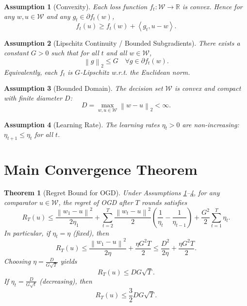 \documentclass{article}
\newtheorem{assumption}{Assumption}
\newtheorem{theorem}{Theorem}
\newcommand{\R}{\mathbb{R}}
\newcommand{\norm}[1]{\left\| #1 \right\|}
\newcommand{\inner}[2]{\left\langle #1, #2 \right\rangle}
\begin{document}
\begin{assumption}[Convexity] \label{asm:convex}
Each loss function $f_t : \mathcal{W} \to \R$ is convex. Hence for any $w, u \in \mathcal{W}$ and any $g_t \in \partial f_t(w)$,
\begin{equation}
    f_t(u) \ge f_t(w) + \inner{g_t}{u - w}.
\end{equation}
\end{assumption}

\begin{assumption}[Lipschitz Continuity / Bounded Subgradients] \label{asm:lipschitz}
There exists a constant $G > 0$ such that for all $t$ and all $w \in \mathcal{W}$,
\begin{equation}
    \norm{g}_2 \le G \quad \forall g \in \partial f_t(w).
\end{equation}
Equivalently, each $f_t$ is $G$-Lipschitz w.r.t. the Euclidean norm.
\end{assumption}

\begin{assumption}[Bounded Domain] \label{asm:bounded}
The decision set $\mathcal{W}$ is convex and compact with finite diameter $D$:
\begin{equation}
    D = \max_{w, u \in \mathcal{W}} \norm{w - u}_2 < \infty.
\end{equation}
\end{assumption}

\begin{assumption}[Learning Rate] \label{asm:lr}
The learning rates $\eta_t > 0$ are non-increasing: $\eta_{t+1} \le \eta_t$ for all $t$.
\end{assumption}

\section*{Main Convergence Theorem}
\begin{theorem}[Regret Bound for OGD] \label{thm:regret}
Under Assumptions \ref{asm:convex}--\ref{asm:lr}, for any comparator $u \in \mathcal{W}$, the regret of OGD after $T$ rounds satisfies
\begin{equation}
    R_T(u) \le \frac{\norm{w_1 - u}^2}{2\eta_1} + \sum_{t=2}^T \frac{\norm{w_t - u}^2}{2} \left( \frac{1}{\eta_t} - \frac{1}{\eta_{t-1}} \right) + \frac{G^2}{2} \sum_{t=1}^T \eta_t.
\end{equation}
In particular, if $\eta_t = \eta$ (fixed), then
\begin{equation}
    R_T(u) \le \frac{\norm{w_1 - u}^2}{2\eta} + \frac{\eta G^2 T}{2} \le \frac{D^2}{2\eta} + \frac{\eta G^2 T}{2}.
\end{equation}
Choosing $\eta = \frac{D}{G\sqrt{T}}$ yields
\begin{equation}
    R_T(u) \le D G \sqrt{T}.
\end{equation}
If $\eta_t = \frac{D}{G\sqrt{t}}$ (decreasing), then
\begin{equation}
    R_T(u) \le \frac{3}{2} D G \sqrt{T}.
\end{equation}
\end{theorem}
\end{document}
